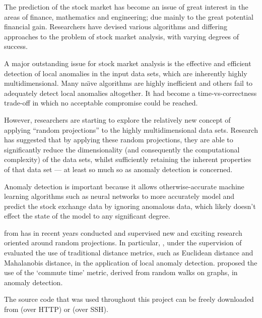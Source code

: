 The prediction of the stock market has become an issue of great interest in the
areas of finance, mathematics and engineering; due mainly to the great potential
financial gain. Researchers have devised various algorithms and differing
approaches to the problem of stock market analysis, with varying degrees of
success.

A major outstanding issue for stock market analysis is the effective and
efficient detection of local anomalies in the input data sets, which are
inherently highly multidimensional. Many na\"{\i}ve algorithms are highly
inefficient and others fail to adequately detect local anomalies altogether. It
had become a time-vs-correctness trade-off in which no acceptable compromise
could be reached.

However, researchers are starting to explore the relatively new concept of
applying ``random projections'' to the highly multidimensional data sets.
Research has suggested that by applying these random projections, they are able
to significantly reduce the dimensionality (and consequently the computational
complexity) of the data sets, whilst sufficiently retaining the inherent
properties of that data set --- at least so much so as anomaly detection is
concerned.

Anomaly detection is important because it allows otherwise-accurate machine
learning algorithms such as neural networks to more accurately model and predict
the stock exchange data by ignoring anomalous data, which likely doesn't effect
the state of the model to any significant degree.

 from \universityName{} has in recent years conducted and
supervised new and exciting research oriented around random projections. In
particular, , under the supervision of 
evaluated the use of traditional distance metrics, such as Euclidean distance
and Mahalanobis distance, in the application of local anomaly detection.
 proposed the use of the `commute time' metric, derived from
random walks on graphs, in anomaly detection.

The source code that was used throughout this project can be freely downloaded
from \gitRepoHTTP{} (over HTTP) or \gitRepoSSH{} (over SSH).
